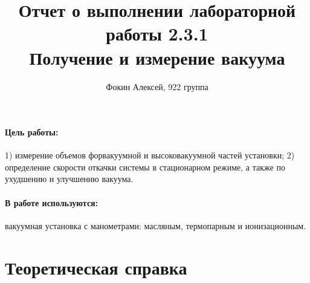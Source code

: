 \documentclass[12pt,a4paper]{article}
\title{
Отчет о выполнении лабораторной работы 2.3.1 \\
Получение и измерение вакуума
}
\author{Фокин Алексей, 922 группа}
\begin{document}
\maketitle

\paragraph{Цель работы:} 1) измерение объемов форвакуумной и высоковакуумной частей установки; 2) определение скорости откачки системы в стационарном режиме, а также по ухудшению и улучшению вакуума.
\paragraph{В работе используются:} вакуумная установка с манометрами: масляным, термопарным и ионизационным.

\section{Теоретическая справка}
\end{document}
